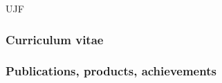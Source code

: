 \begin{sitedescription}{UJF}




\subsubsection*{Curriculum vitae}





%

\subsubsection*{Publications, products, achievements}


\end{sitedescription}
